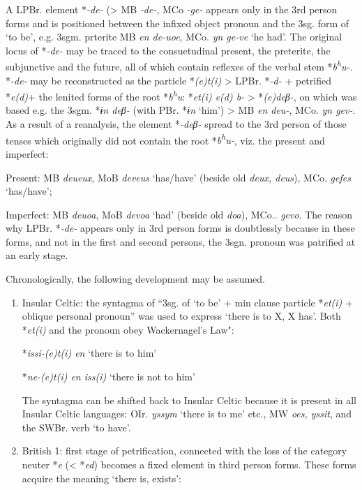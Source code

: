 {A LPBr. element *\textit{-de-} (> MB \textit{-de-}, MCo \textit{-ge-} appears only in the 3rd person forms and is positioned between the infixed object pronoun and the 3sg. form of `to be', e.g. 3sgm. prterite MB \textit{en de-uoe}, MCo. \textit{yn ge-ve} `he had'. The original locus of *\textit{-de-} may be traced to the consuetudinal present, the preterite, the subjunctive and the future, all of which contain reflexes of the verbal stem *\textit{b\textsuperscript{h}u-}. *\textit{-de-} may be reconstructed as the particle *\textit{(e)t(i)} > LPBr. *\textit{-d-} + petrified *\textit{e(d)}+ the lenited forms of the root *\textit{b\textsuperscript{h}u}: *\textit{et(i) e(d) b-} > *\textit{(e)deβ-}, on which was based e.g. the 3sgm. *\textit{ɨn deβ-} (with PBr. *\textit{ɨn} `him') > MB \textit{en deu-}, MCo. \textit{yn gev-}. As a result of a reanalysis, the element *\textit{-deβ-} spread to the 3rd person of those tenses which originally did not contain the root *\textit{b\textsuperscript{h}u-}, viz. the present and imperfect:

Present: MB \textit{deueux}, MoB \textit{deveus} `has/have' (beside old \textit{deux, deus}), MCo. \textit{gefes} `has/have';

Imperfect: MB \textit{deuoa}, MoB \textit{devoa} `had' (beside old \textit{doa}), MCo.. \textit{gevo}. The reason why LPBr. *\textit{-de-} appears only in 3rd person forms is doubtlessly because in these forms, and not in the first and second persons, the 3sgn. pronoun was patrified at an early stage.

Chronologically, the following development may be assumed.
\begin{enumerate}
\item Insular Celtic: the syntagma of ``3sg. of `to be' + min clause particle *\textit{et(i)} + oblique personal pronoun'' was used to express `there is to X, X has'. Both *\textit{et(i)} and the pronoun obey Wackernagel's Law":

*\textit{issi-(e)t(i) en} `there is to him'

*\textit{ne-(e)t(i) en iss(i)} `there is not to him'

The syntagma can be shifted back to Insular Celtic because it is present in all Insular Celtic languages: OIr. \textit{yssym} `there is to me' etc., MW \textit{oes, yssit}, and the SWBr. verb `to have'. 
\item British 1: first stage of petrification, connected with the loss of the category neuter *\textit{e} (< *\textit{ed}) becomes a fixed element in third person forms. These forms acquire the meaning `there is, exists':


\end{enumerate}}
